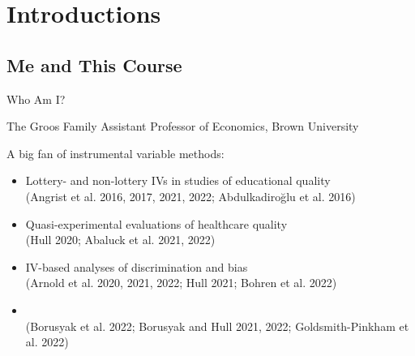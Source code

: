 \documentclass{beamer}
\begin{document}

\section{Introductions}

\subsection{Me and This Course}
\begin{frame}{Who Am I?}

The Groos Family Assistant Professor of Economics, Brown University\pause

A big fan of instrumental variable methods:\pause
\begin{itemize}
  \item Lottery- and non-lottery IVs in studies of educational quality \\ {\scriptsize \textcolor{red!75!green!50!blue!25!gray}{(Angrist et al. 2016, 2017, 2021, 2022; Abdulkadiro\u{g}lu et al. 2016)}}
  \item Quasi-experimental evaluations of healthcare quality \\ {\scriptsize \textcolor{red!75!green!50!blue!25!gray}{(Hull 2020; Abaluck et al. 2021, 2022)}}
  \item IV-based analyses of discrimination and bias \\ {\scriptsize \textcolor{red!75!green!50!blue!25!gray}{(Arnold et al. 2020, 2021, 2022; Hull 2021; Bohren et al. 2022)}}

  \item {} \\ {\scriptsize \textcolor{red!75!green!50!blue!25!gray}{(Borusyak et al. 2022; Borusyak and Hull 2021, 2022; Goldsmith-Pinkham et al. 2022)}}
\end{itemize}

\end{frame}
\end{document}
